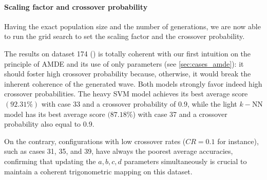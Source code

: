 \documentclass[12pt, openany]{article}
\begin{document}
\paragraph{Scaling factor and crossover probability} Having the exact population size and the number of generations, we are now able to run the grid search to set the scaling factor and the crossover probability.

The results on dataset 174 () is totally coherent with our first intuition on the principle of AMDE and its use of only parameters (see \ref{sec:cases_amde}): it should foster high crossover probability because, otherwise, it would break the inherent coherence of the generated wave. Both models strongly favor indeed high crossover probabilities. The heavy SVM model achieves its best average score $(92.31\%)$ with case 33 and a crossover probability of $0.9$, while the light $k-$NN model has its best average score $(87.18\%$) with case 37 and a crossover probability also equal to $0.9$. 

On the contrary, configurations with low crossover rates ($CR=0.1$ for instance), such as cases 31, 35, and 39, have always the poorest average accuracies, confirming that updating the $a,b,c,d$ parameters simultaneously is crucial to maintain a coherent trigonometric mapping on this dataset.
\end{document}
